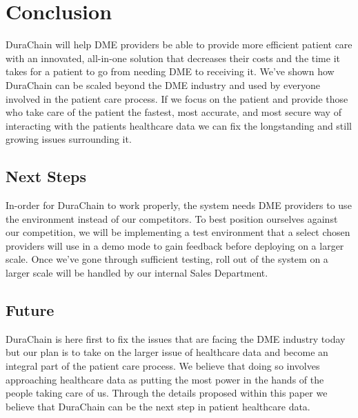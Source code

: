 \documentclass[12pt]{article}
\begin{document}
\section{Conclusion}
DuraChain will help DME providers be able to provide more efficient patient care with an innovated, all-in-one solution that decreases their costs and the time it takes for a patient to go from needing DME to receiving it. We’ve shown how DuraChain can be scaled beyond the DME industry and used by everyone involved in the patient care process. If we focus on the patient and provide those who take care of the patient the fastest, most accurate, and most secure way of interacting with the patients healthcare data we can fix the longstanding and still growing issues surrounding it.

  \subsection{Next Steps}
  In-order for DuraChain to work properly, the system needs DME providers to use the environment instead of our competitors. To best position ourselves against our competition, we will be implementing a test environment that a select chosen providers will use in a demo mode to gain feedback before deploying on a larger scale. Once we’ve gone through sufficient testing, roll out of the system on a larger scale will be handled by our internal Sales Department.

  \subsection{Future}
  DuraChain is here first to fix the issues that are facing the DME industry today but our plan is to take on the larger issue of healthcare data and become an integral part of the patient care process. We believe that doing so involves approaching healthcare data as putting the most power in the hands of the people taking care of us. Through the details proposed within this paper we believe that DuraChain can be the next step in patient healthcare data.
\end{document}
